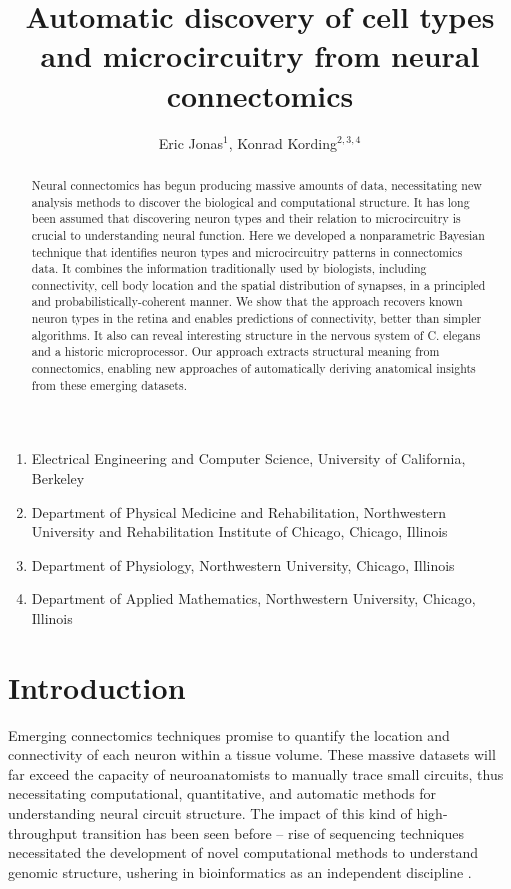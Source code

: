 \documentclass{article}
\title{Automatic discovery of cell types and microcircuitry from neural connectomics}
\author{Eric Jonas$^1$, Konrad Kording$^{2, 3,4}$}
\begin{document}
\maketitle

\begin{small}
\begin{enumerate}
  \item Electrical Engineering and Computer Science, University of California, Berkeley
  \item Department of Physical Medicine and Rehabilitation,
    Northwestern University and Rehabilitation Institute of Chicago,
    Chicago, Illinois
  \item Department of Physiology, Northwestern University, Chicago, Illinois
  \item Department of Applied Mathematics, Northwestern University, Chicago, Illinois
\end{enumerate}
\end{small}

\begin{abstract}
  Neural connectomics has begun producing massive amounts of data,
  necessitating new analysis methods to discover the biological and
  computational structure. It has long been assumed that discovering
  neuron types and their relation to microcircuitry is crucial to
  understanding neural function. Here we developed a nonparametric
  Bayesian technique that identifies neuron types and microcircuitry
  patterns in connectomics data. It combines the information
  traditionally used by biologists, including connectivity, cell body
  location and the spatial distribution of synapses, in a
  principled and probabilistically-coherent manner. We show that the
  approach recovers known neuron types in the retina and enables
  predictions of connectivity, better than simpler algorithms. It also
  can reveal interesting structure in the nervous system of
  C. elegans and a historic microprocessor.
  Our approach extracts structural meaning from
  connectomics, enabling new approaches of automatically deriving
  anatomical insights from these emerging datasets.
\end{abstract}

\listoffixmes

\section*{Introduction}
Emerging connectomics techniques \autocite{Morgan2013,Zador2012}
promise to quantify the location and connectivity of each neuron
within a tissue volume. These massive datasets will far exceed the
capacity of neuroanatomists to manually trace small circuits, thus
necessitating computational, quantitative, and automatic methods for
understanding neural circuit structure.  The impact of this kind of
high-throughput transition has been seen before -- rise of sequencing
techniques necessitated the development of novel computational methods
to understand genomic structure, ushering in  bioinformatics
as an independent discipline \autocite{Koboldt2013}.
\end{document}
